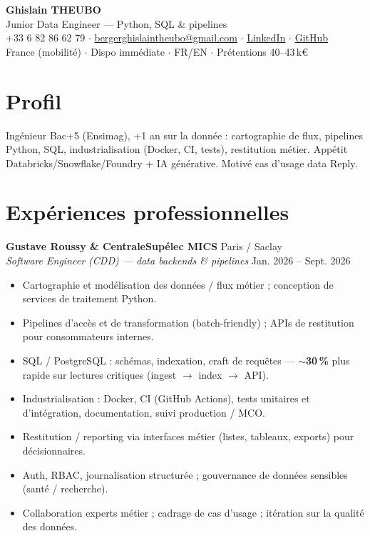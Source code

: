 \documentclass[10pt,a4paper]{article}
\begin{document}
\begin{center}
{\LARGE\bfseries Ghislain THEUBO}\\[1pt]
{\large Junior Data Engineer --- Python, SQL \& pipelines}\\[2pt]
+33 6 82 86 62 79 $\cdot$
\href{mailto:bergerghislaintheubo@gmail.com}{bergerghislaintheubo@gmail.com} $\cdot$
\href{https://www.linkedin.com/in/berger-ghislain}{LinkedIn} $\cdot$
\href{https://github.com/Bergerghislain}{GitHub}\\[1pt]
France (mobilit\'e) $\cdot$ Dispo imm\'ediate $\cdot$ FR/EN $\cdot$ Pr\'etentions 40--43\,k€
\end{center}

\section{Profil}
Ing\'enieur Bac+5 (Ensimag), +1 an sur la donn\'ee : cartographie de flux, pipelines Python, SQL, industrialisation (Docker, CI, tests), restitution m\'etier. App\'etit Databricks/Snowflake/Foundry + IA g\'en\'erative. Motiv\'e cas d'usage data Reply.

\section{Exp\'eriences professionnelles}
\textbf{Gustave Roussy \& CentraleSup\'elec MICS} \hfill Paris / Saclay\\
\textit{Software Engineer (CDD) --- data backends \& pipelines} \hfill Jan. 2026 -- Sept. 2026
\begin{itemize}
  \item Cartographie et mod\'elisation des donn\'ees / flux m\'etier ; conception de services de traitement Python.
  \item Pipelines d'acc\`es et de transformation (batch-friendly) ; APIs de restitution pour consommateurs internes.
  \item SQL / PostgreSQL : sch\'emas, indexation, craft de requ\^etes --- $\sim$\textbf{30\,\%} plus rapide sur lectures critiques (ingest $\rightarrow$ index $\rightarrow$ API).
  \item Industrialisation : Docker, CI (GitHub Actions), tests unitaires et d'int\'egration, documentation, suivi production / MCO.
  \item Restitution / reporting via interfaces m\'etier (listes, tableaux, exports) pour d\'ecisionnaires.
  \item Auth, RBAC, journalisation structur\'ee ; gouvernance de donn\'ees sensibles (sant\'e / recherche).
  \item Collaboration experts m\'etier ; cadrage de cas d'usage ; it\'eration sur la qualit\'e des donn\'ees.
\end{itemize}
\end{document}
